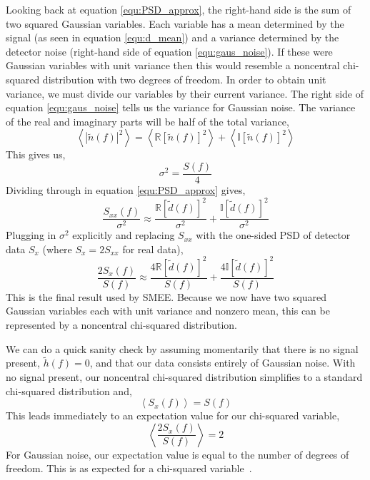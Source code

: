Looking back at equation \ref{equ:PSD_approx}, the right-hand side is the sum of two squared Gaussian variables. Each variable has a mean determined by the signal (as seen in equation \ref{equ:d_mean}) and a variance determined by the detector noise (right-hand side of equation \ref{equ:gaus_noise}). If these were Gaussian variables with unit variance then this would resemble a noncentral chi-squared distribution with two degrees of freedom. In order to obtain unit variance, we must divide our variables by their current variance. The right side of equation \ref{equ:gaus_noise} tells us the variance for Gaussian noise. The variance of the real and imaginary parts will be half of the total variance,
\begin{equation}
    \left\langle |\tilde{n}(f)|^{2} \right\rangle = \left\langle \mathbb{R}[\tilde{n}(f)]^{2} \right\rangle + \left\langle \mathbb{I}[\tilde{n}(f)]^{2} \right\rangle
\end{equation}
This gives us,
\begin{equation}
    \sigma^{2} = \frac{S(f)}{4}
\end{equation}
Dividing through in equation \ref{equ:PSD_approx} gives,
\begin{equation}
    \frac{S_{xx}(f)}{\sigma^{2}} \approx \frac{\mathbb{R}[\tilde{d}(f)]^{2}}{\sigma^{2}} + \frac{\mathbb{I}[\tilde{d}(f)]^{2}}{\sigma^{2}}
\end{equation}
Plugging in $\sigma^{2}$ explicitly and replacing $S_{xx}$ with the one-sided PSD of detector data $S_{x}$ (where $S_{x} = 2S_{xx}$ for real data),
\begin{equation}
    \frac{2S_{x}(f)}{S(f)} \approx \frac{4\mathbb{R}[\tilde{d}(f)]^{2}}{S(f)} + \frac{4\mathbb{I}[\tilde{d}(f)]^{2}}{S(f)}
\end{equation}
This is the final result used by SMEE. Because we now have two squared Gaussian variables each with unit variance and nonzero mean, this can be represented by a noncentral chi-squared distribution.

We can do a quick sanity check by assuming momentarily that there is no signal present, $\tilde{h}(f) = 0$, and that our data consists entirely of Gaussian noise. With no signal present, our noncentral chi-squared distribution simplifies to a standard chi-squared distribution and,
\begin{equation}
    \left\langle S_{x}(f) \right\rangle = S(f)
\end{equation}
This leads immediately to an expectation value for our chi-squared variable,
\begin{equation}
    \left\langle \frac{2S_{x}(f)}{S(f)} \right\rangle = 2
\end{equation}
For Gaussian noise, our expectation value is equal to the number of degrees of freedom. This is as expected for a chi-squared variable~\cite{stats_shao}.

